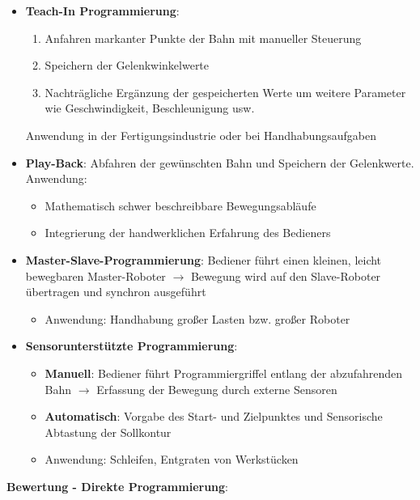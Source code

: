 \begin{itemize}
	\item \textbf{Teach-In Programmierung}: 
	\begin{enumerate}
		\item Anfahren markanter Punkte der Bahn mit manueller Steuerung
		\item Speichern der Gelenkwinkelwerte
		\item Nachträgliche Ergänzung der gespeicherten Werte um weitere Parameter wie Geschwindigkeit, Beschleunigung usw.
	\end{enumerate}
	Anwendung in der Fertigungsindustrie oder bei Handhabungsaufgaben
	\item \textbf{Play-Back}: Abfahren der gewünschten Bahn und Speichern der Gelenkwerte. Anwendung:
	\begin{itemize}
		\item Mathematisch schwer beschreibbare Bewegungsabläufe
		\item Integrierung der handwerklichen Erfahrung des Bedieners
	\end{itemize}
	\item \textbf{Master-Slave-Programmierung}: Bediener führt einen kleinen, leicht bewegbaren Master-Roboter $\rightarrow$ Bewegung wird auf den Slave-Roboter übertragen und synchron ausgeführt
	\begin{itemize}
		\item Anwendung: Handhabung großer Lasten bzw. großer Roboter
	\end{itemize}
	\item \textbf{Sensorunterstützte Programmierung}: 
	\begin{itemize}
		\item \textbf{Manuell}: Bediener führt Programmiergriffel entlang der abzufahrenden Bahn $\rightarrow$ Erfassung der Bewegung durch externe Sensoren
		\item \textbf{Automatisch}: Vorgabe des Start- und Zielpunktes und Sensorische Abtastung der Sollkontur
		\item Anwendung: Schleifen, Entgraten von Werkstücken
	\end{itemize}
\end{itemize}
\bigskip
\textbf{Bewertung - Direkte Programmierung}:
